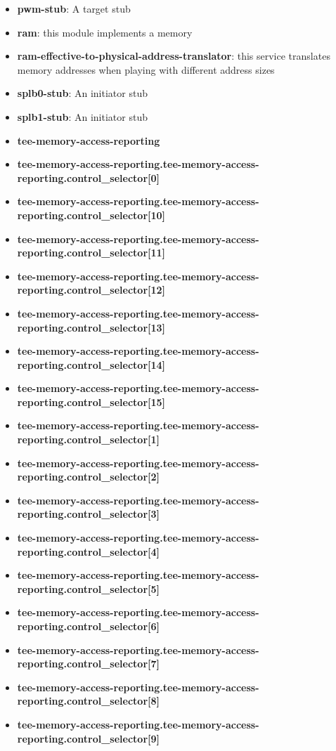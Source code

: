\begin{itemize}
\item \textbf{pwm-stub}: A target stub
\item \textbf{ram}: this module implements a memory
\item \textbf{ram-effective-to-physical-address-translator}: this service translates memory addresses when playing with different address sizes
\item \textbf{splb0-stub}: An initiator stub
\item \textbf{splb1-stub}: An initiator stub
\item \textbf{tee-memory-access-reporting}
\item \textbf{tee-memory-access-reporting.tee-memory-access-reporting.control\_selector[0]}
\item \textbf{tee-memory-access-reporting.tee-memory-access-reporting.control\_selector[10]}
\item \textbf{tee-memory-access-reporting.tee-memory-access-reporting.control\_selector[11]}
\item \textbf{tee-memory-access-reporting.tee-memory-access-reporting.control\_selector[12]}
\item \textbf{tee-memory-access-reporting.tee-memory-access-reporting.control\_selector[13]}
\item \textbf{tee-memory-access-reporting.tee-memory-access-reporting.control\_selector[14]}
\item \textbf{tee-memory-access-reporting.tee-memory-access-reporting.control\_selector[15]}
\item \textbf{tee-memory-access-reporting.tee-memory-access-reporting.control\_selector[1]}
\item \textbf{tee-memory-access-reporting.tee-memory-access-reporting.control\_selector[2]}
\item \textbf{tee-memory-access-reporting.tee-memory-access-reporting.control\_selector[3]}
\item \textbf{tee-memory-access-reporting.tee-memory-access-reporting.control\_selector[4]}
\item \textbf{tee-memory-access-reporting.tee-memory-access-reporting.control\_selector[5]}
\item \textbf{tee-memory-access-reporting.tee-memory-access-reporting.control\_selector[6]}
\item \textbf{tee-memory-access-reporting.tee-memory-access-reporting.control\_selector[7]}
\item \textbf{tee-memory-access-reporting.tee-memory-access-reporting.control\_selector[8]}
\item \textbf{tee-memory-access-reporting.tee-memory-access-reporting.control\_selector[9]}

\end{itemize}

